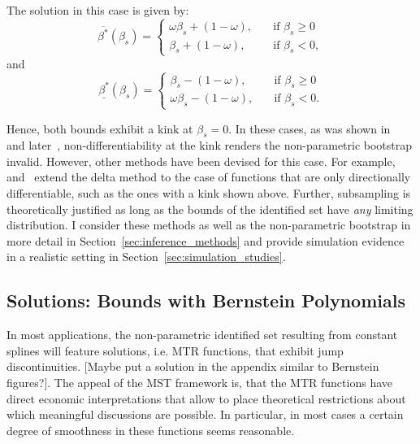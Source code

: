 \documentclass[12pt,a4paper,english]{article} %
\numberwithin{equation}{section}
\theoremstyle{definition}
\theoremstyle{remark}
\theoremstyle{plain}
\begin{document}
The solution in this case is given by:
\begin{equation}
	\overline{\beta^*}(\beta_s)=
	\begin{cases}
		\omega \beta_s + (1 - \omega),& \quad \text{if } \beta_s \geq 0\\
		\beta_s + (1 - \omega),              & \quad \text{if } \beta_s < 0,
	\end{cases}
\end{equation}
and
\begin{equation}
	\underline{\beta^*}(\beta_s)=
	\begin{cases}
		\beta_s - (1 - \omega),& \quad \text{if } \beta_s \geq 0\\
		\omega \beta_s - (1 - \omega),              & \quad \text{if } \beta_s < 0.
	\end{cases}
\end{equation}

Hence, both bounds exhibit a kink at $\beta_s=0$.
In these cases, as was shown in~\cite{dumbgen1993nondifferentiable} and later~\cite{fang2019infdirdiff}, non-differentiability at the kink renders the non-parametric bootstrap invalid.
However, other methods have been devised for this case. For example,~\cite{fang2019infdirdiff} and~\cite{hong2018numerical} extend the delta method to the case of functions that are only directionally differentiable, such as the ones with a kink shown above.
Further, subsampling is theoretically justified as long as the bounds of the identified set have \textit{any} limiting distribution.
I consider these methods as well as the non-parametric bootstrap in more detail in Section~\ref{sec:inference_methods} and provide simulation evidence in a realistic setting in Section~\ref{sec:simulation_studies}.

\subsection{Solutions: Bounds with Bernstein Polynomials}
In most applications, the non-parametric identified set resulting from constant splines will feature solutions, i.e. MTR functions, that exhibit jump discontinuities.
[Maybe put a solution in the appendix similar to Bernstein figures?].
The appeal of the MST framework is, that the MTR functions have direct economic interpretations that allow to place theoretical restrictions about which meaningful discussions are possible.
In particular, in most cases a certain degree of smoothness in these functions seems reasonable.
\end{document}
